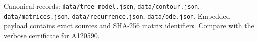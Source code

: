 \documentclass[11pt]{article}
\begin{document}
\vfill
\colorbox{soft}{\parbox{.97\textwidth}{\tiny Canonical records: \texttt{data/tree\_model.json}, \texttt{data/contour.json}, \texttt{data/matrices.json}, \texttt{data/recurrence.json}, \texttt{data/ode.json}. Embedded payload contains exact sources and SHA-256 matrix identifiers. Compare with the verbose certificate for A120590.}}
\end{document}
